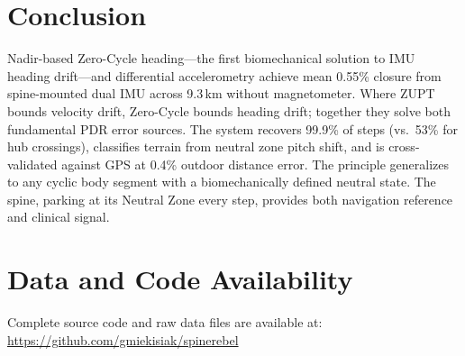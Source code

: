 \documentclass[11pt,a4paper]{article}
\begin{document}
\section{Conclusion}
\label{sec:conclusion}

Nadir-based Zero-Cycle heading---the first biomechanical solution to IMU
heading drift---and differential accelerometry achieve mean 0.55\% closure from
spine-mounted dual IMU across 9.3\,km without magnetometer. Where ZUPT bounds
velocity drift, Zero-Cycle bounds heading drift; together they solve both
fundamental PDR error sources. The system recovers 99.9\% of steps (vs.\ 53\%
for hub crossings), classifies terrain from neutral zone pitch shift, and is
cross-validated against GPS at 0.4\% outdoor distance error. The principle
generalizes to any cyclic body segment with a biomechanically defined neutral
state. The spine, parking at its Neutral Zone every step, provides both
navigation reference and clinical signal.

\section*{Data and Code Availability}

Complete source code and raw data files are available at:\\
\url{https://github.com/gmiekisiak/spinerebel}
\end{document}
